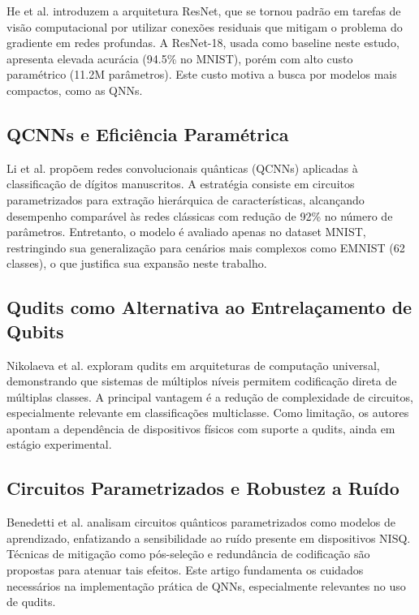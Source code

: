 \documentclass[12pt]{article}
\begin{document}
He et al. \cite{He2016} introduzem a arquitetura ResNet, que se tornou padrão em tarefas de visão computacional por utilizar conexões residuais que mitigam o problema do gradiente em redes profundas. A ResNet-18, usada como baseline neste estudo, apresenta elevada acurácia (94.5\% no MNIST), porém com alto custo paramétrico (11.2M parâmetros). Este custo motiva a busca por modelos mais compactos, como as QNNs.

\subsection{QCNNs e Eficiência Paramétrica}

Li et al. \cite{Li2020} propõem redes convolucionais quânticas (QCNNs) aplicadas à classificação de dígitos manuscritos. A estratégia consiste em circuitos parametrizados para extração hierárquica de características, alcançando desempenho comparável às redes clássicas com redução de 92\% no número de parâmetros. Entretanto, o modelo é avaliado apenas no dataset MNIST, restringindo sua generalização para cenários mais complexos como EMNIST (62 classes), o que justifica sua expansão neste trabalho.

\subsection{Qudits como Alternativa ao Entrelaçamento de Qubits}

Nikolaeva et al. \cite{Nikolaeva2024} exploram qudits em arquiteturas de computação universal, demonstrando que sistemas de múltiplos níveis permitem codificação direta de múltiplas classes. A principal vantagem é a redução de complexidade de circuitos, especialmente relevante em classificações multiclasse. Como limitação, os autores apontam a dependência de dispositivos físicos com suporte a qudits, ainda em estágio experimental.

\subsection{Circuitos Parametrizados e Robustez a Ruído}

Benedetti et al. \cite{Benedetti2019} analisam circuitos quânticos parametrizados como modelos de aprendizado, enfatizando a sensibilidade ao ruído presente em dispositivos NISQ. Técnicas de mitigação como pós-seleção e redundância de codificação são propostas para atenuar tais efeitos. Este artigo fundamenta os cuidados necessários na implementação prática de QNNs, especialmente relevantes no uso de qudits.
\end{document}
